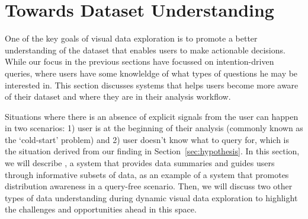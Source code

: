 \section{Towards Dataset Understanding\label{sec:understanding}}
\par One of the key goals of visual data exploration is to promote a better understanding of the dataset that enables users to make actionable decisions. While our focus in the previous sections have focussed on intention-driven queries, where users have some knowleldge of what types of questions he may be interested in. This section discusses systems that helps users become more aware of their dataset and where they are in their analysis workflow. %
\par Situations where there is an absence of explicit signals from the user can happen in two scenarios: 1) user is at the beginning of their analysis (commonly known as the `cold-start' problem) and 2) user doesn't know what to query for, which is the situation derived from our \zv finding in Section~\ref{sec:hypothesis}. In this section, we will describe \sbd, a system that provides data summaries and guides users through informative subsets of data, as an example of a system that promotes distribution awareness in a query-free scenario. Then, we will discuss two other types of data understanding during dynamic visual data exploration to highlight the challenges and opportunities ahead in this space.
